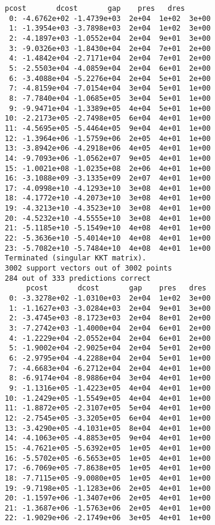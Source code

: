 \documentclass[11pt]{article}
\begin{document}
    \begin{Verbatim}[commandchars=\\\{\}]
     pcost       dcost       gap    pres   dres
 0: -4.6762e+02 -1.4739e+03  2e+04  1e+02  3e+00
 1: -1.3954e+03 -3.7898e+03  2e+04  1e+02  3e+00
 2: -4.1897e+03 -1.0552e+04  2e+04  9e+01  3e+00
 3: -9.0326e+03 -1.8430e+04  2e+04  7e+01  2e+00
 4: -1.4842e+04 -2.7171e+04  2e+04  7e+01  2e+00
 5: -2.5503e+04 -4.0859e+04  2e+04  6e+01  2e+00
 6: -3.4088e+04 -5.2276e+04  2e+04  5e+01  2e+00
 7: -4.8159e+04 -7.0154e+04  3e+04  5e+01  1e+00
 8: -7.7840e+04 -1.0685e+05  3e+04  5e+01  1e+00
 9: -9.9471e+04 -1.3389e+05  4e+04  5e+01  1e+00
10: -2.2173e+05 -2.7498e+05  6e+04  4e+01  1e+00
11: -4.5695e+05 -5.4464e+05  9e+04  4e+01  1e+00
12: -1.3964e+06 -1.5759e+06  2e+05  4e+01  1e+00
13: -3.8942e+06 -4.2918e+06  4e+05  4e+01  1e+00
14: -9.7093e+06 -1.0562e+07  9e+05  4e+01  1e+00
15: -1.0021e+08 -1.0235e+08  2e+06  4e+01  1e+00
16: -3.1088e+09 -3.1335e+09  2e+07  4e+01  1e+00
17: -4.0998e+10 -4.1293e+10  3e+08  4e+01  1e+00
18: -4.1772e+10 -4.2073e+10  3e+08  4e+01  1e+00
19: -4.3213e+10 -4.3523e+10  3e+08  4e+01  1e+00
20: -4.5232e+10 -4.5555e+10  3e+08  4e+01  1e+00
21: -5.1185e+10 -5.1549e+10  4e+08  4e+01  1e+00
22: -5.3636e+10 -5.4014e+10  4e+08  4e+01  1e+00
23: -5.7082e+10 -5.7484e+10  4e+08  4e+01  1e+00
Terminated (singular KKT matrix).
3002 support vectors out of 3002 points
284 out of 333 predictions correct
     pcost       dcost       gap    pres   dres
 0: -3.3278e+02 -1.0310e+03  2e+04  1e+02  3e+00
 1: -1.1627e+03 -3.0284e+03  2e+04  9e+01  3e+00
 2: -3.4745e+03 -8.1723e+03  2e+04  8e+01  2e+00
 3: -7.2742e+03 -1.4000e+04  2e+04  6e+01  2e+00
 4: -1.2229e+04 -2.0552e+04  2e+04  6e+01  2e+00
 5: -1.9002e+04 -2.9025e+04  2e+04  5e+01  2e+00
 6: -2.9795e+04 -4.2288e+04  2e+04  5e+01  1e+00
 7: -4.6683e+04 -6.2712e+04  2e+04  4e+01  1e+00
 8: -6.9174e+04 -8.9886e+04  3e+04  4e+01  1e+00
 9: -1.1316e+05 -1.4223e+05  4e+04  4e+01  1e+00
10: -1.2429e+05 -1.5549e+05  4e+04  4e+01  1e+00
11: -1.8872e+05 -2.3107e+05  5e+04  4e+01  1e+00
12: -2.7545e+05 -3.3205e+05  6e+04  4e+01  1e+00
13: -3.4290e+05 -4.1031e+05  8e+04  4e+01  1e+00
14: -4.1063e+05 -4.8853e+05  9e+04  4e+01  1e+00
15: -4.7621e+05 -5.6392e+05  1e+05  4e+01  1e+00
16: -5.5702e+05 -6.5653e+05  1e+05  4e+01  1e+00
17: -6.7069e+05 -7.8638e+05  1e+05  4e+01  1e+00
18: -7.7115e+05 -9.0080e+05  1e+05  4e+01  1e+00
19: -9.7198e+05 -1.1283e+06  2e+05  4e+01  1e+00
20: -1.1597e+06 -1.3407e+06  2e+05  4e+01  1e+00
21: -1.3687e+06 -1.5763e+06  2e+05  4e+01  1e+00
22: -1.9029e+06 -2.1749e+06  3e+05  4e+01  1e+00

\end{Verbatim}
\end{document}
